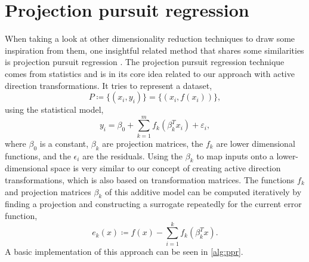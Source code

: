 \documentclass[
  a4paper,  %
  twoside,  %
  bibliography=totoc,
  headsepline,
  cleardoublepage=empty,
  parskip=half,
  draft=false
]{scrbook}
\begin{document}
\section{Projection pursuit regression}

When taking a look at other dimensionality reduction techniques to draw some inspiration from them, one insightful related method that shares some similarities is projection pursuit regression \cite{huber1985projection}.
The projection pursuit regression technique comes from statistics and is in its core idea related to our approach with active direction transformations.
It tries to represent a dataset,
\begin{equation}
P \coloneqq \{(x_i, y_i)\}=\{(x_i, f(x_i))\},
\end{equation}
using the statistical model,
\begin{equation}
y_i=\beta_0 + \sum_{k=1}^m f_k(\beta_k^T x_i) + \varepsilon_i,
\label{eq:ppr}
\end{equation}
where $\beta_0$ is a constant, $\beta_k$ are projection matrices, the $f_k$ are lower dimensional functions, and the $\epsilon_i$ are the residuals.
Using the $\beta_k$ to map inputs onto a lower-dimensional space is very similar to our concept of creating active direction transformations, which is also based on transformation matrices.
The functions $f_k$ and projection matrices $\beta_k$ of this additive model can be computed iteratively by finding a projection and constructing a surrogate repeatedly for the current error function,
\begin{equation}
e_k(x) \coloneqq f(x) - \sum_{i=1}^k f_k(\beta_k^T x).
\end{equation}
%
A basic implementation of this approach can be seen in \cref{alg:ppr}.
\end{document}
